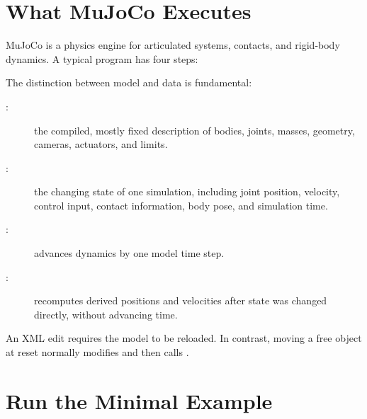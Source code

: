 \section{What MuJoCo Executes}
\label{sec:mujoco-concepts}

MuJoCo is a physics engine for articulated systems, contacts, and rigid-body
dynamics. A typical program has four steps:

\begin{center}
\end{center}

The distinction between model and data is fundamental:

\begin{description}
  \item[:] the compiled, mostly fixed description of
  bodies, joints, masses, geometry, cameras, actuators, and limits.
  \item[:] the changing state of one simulation,
  including joint position, velocity, control input, contact information, body
  pose, and simulation time.
  \item[:] advances dynamics by one model time step.
  \item[:] recomputes derived positions and
  velocities after state was changed directly, without advancing time.
\end{description}

An XML edit requires the model to be reloaded. In contrast, moving a free object
at reset normally modifies  and then calls
.

\section{Run the Minimal Example}

